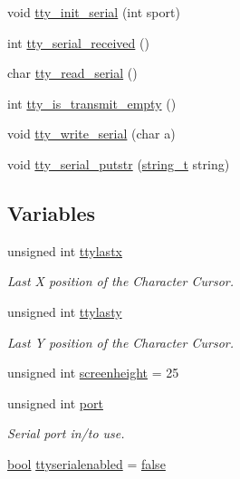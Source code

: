 \begin{DoxyCompactItemize}
void \hyperlink{a00035_a7f3b5b4ace4add94f4bdaf99b13a88ee_a7f3b5b4ace4add94f4bdaf99b13a88ee}{tty\+\_\+init\+\_\+serial} (int sport)
\item 
int \hyperlink{a00035_ac3a6be4b1f86c89b946f286f6bb35444_ac3a6be4b1f86c89b946f286f6bb35444}{tty\+\_\+serial\+\_\+received} ()
\item 
char \hyperlink{a00035_aa0d34a7d4cac7aa11db8b45becd9e95c_aa0d34a7d4cac7aa11db8b45becd9e95c}{tty\+\_\+read\+\_\+serial} ()
\item 
int \hyperlink{a00035_acecd7700d007e249e31d744a98eb3c7f_acecd7700d007e249e31d744a98eb3c7f}{tty\+\_\+is\+\_\+transmit\+\_\+empty} ()
\item 
void \hyperlink{a00035_a6439cc460585c2ec3c50b390a4b4b250_a6439cc460585c2ec3c50b390a4b4b250}{tty\+\_\+write\+\_\+serial} (char a)
\item 
void \hyperlink{a00035_ab44a629b283c00c6d055049ac1e00275_ab44a629b283c00c6d055049ac1e00275}{tty\+\_\+serial\+\_\+putstr} (\hyperlink{a00029_ada436671bc57dfd805a9f3974c81e618_ada436671bc57dfd805a9f3974c81e618}{string\+\_\+t} string)
\end{DoxyCompactItemize}
\subsection*{Variables}
\begin{DoxyCompactItemize}
\item 
unsigned int \hyperlink{a00035_afeb00c6ff15d0bf9455519131f45c651_afeb00c6ff15d0bf9455519131f45c651}{ttylastx}
\begin{DoxyCompactList}\small\item\em Last X position of the Character Cursor. \end{DoxyCompactList}\item 
unsigned int \hyperlink{a00035_adb472c81e607c23c4e70bdaed8153279_adb472c81e607c23c4e70bdaed8153279}{ttylasty}
\begin{DoxyCompactList}\small\item\em Last Y position of the Character Cursor. \end{DoxyCompactList}\item 
unsigned int \hyperlink{a00035_ab8b80ea0ba671319c70e7a9207589648_ab8b80ea0ba671319c70e7a9207589648}{screenheight} = 25
\item 
unsigned int \hyperlink{a00035_a938bdc6ae46c346147b6d4f67ad1e704_a938bdc6ae46c346147b6d4f67ad1e704}{port}
\begin{DoxyCompactList}\small\item\em Serial port in/to use. \end{DoxyCompactList}\item 
\hyperlink{a00038_af6a258d8f3ee5206d682d799316314b1_af6a258d8f3ee5206d682d799316314b1}{bool} \hyperlink{a00035_a828c82c174edbb885ba73ccbabf98333_a828c82c174edbb885ba73ccbabf98333}{ttyserialenabled} = \hyperlink{a00038_af6a258d8f3ee5206d682d799316314b1_af6a258d8f3ee5206d682d799316314b1ae9de385ef6fe9bf3360d1038396b884c}{false}
\end{DoxyCompactItemize}


